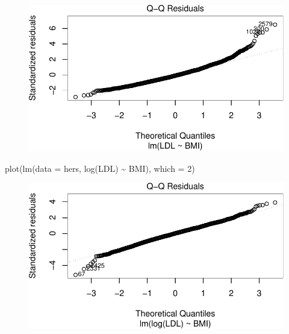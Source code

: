 \documentclass[
  letterpaper,
  DIV=11,
  numbers=noendperiod]{scrreport}
\newenvironment{Shaded}{\begin{snugshade}}{\end{snugshade}}
\newcommand{\AttributeTok}[1]{\textcolor[rgb]{0.40,0.45,0.13}{#1}}
\newcommand{\DecValTok}[1]{\textcolor[rgb]{0.68,0.00,0.00}{#1}}
\newcommand{\FunctionTok}[1]{\textcolor[rgb]{0.28,0.35,0.67}{#1}}
\newcommand{\NormalTok}[1]{\textcolor[rgb]{0.00,0.23,0.31}{#1}}
\newcommand{\SpecialCharTok}[1]{\textcolor[rgb]{0.37,0.37,0.37}{#1}}
\begin{document}
\begin{figure}[H]

{\centering \includegraphics{week4/week4_files/figure-pdf/unnamed-chunk-4-2.pdf}

}

\end{figure}

\begin{Shaded}
\begin{Highlighting}[]
\FunctionTok{plot}\NormalTok{(}\FunctionTok{lm}\NormalTok{(}\AttributeTok{data =}\NormalTok{ hers, }\FunctionTok{log}\NormalTok{(LDL) }\SpecialCharTok{\textasciitilde{}}\NormalTok{ BMI), }\AttributeTok{which =} \DecValTok{2}\NormalTok{)}
\end{Highlighting}
\end{Shaded}

\begin{figure}[H]

{\centering \includegraphics{week4/week4_files/figure-pdf/unnamed-chunk-4-3.pdf}

}

\end{figure}
\end{document}
